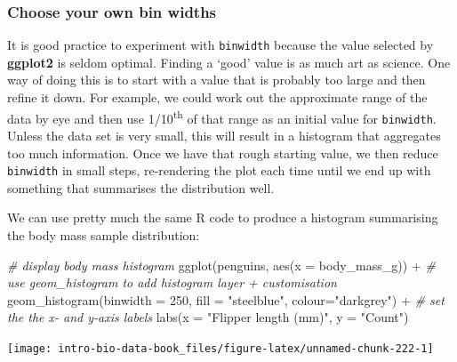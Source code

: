 \documentclass[
]{book}
\newenvironment{Shaded}{\begin{snugshade}}{\end{snugshade}}
\newcommand{\AttributeTok}[1]{\textcolor[rgb]{0.77,0.63,0.00}{#1}}
\newcommand{\CommentTok}[1]{\textcolor[rgb]{0.56,0.35,0.01}{\textit{#1}}}
\newcommand{\DecValTok}[1]{\textcolor[rgb]{0.00,0.00,0.81}{#1}}
\newcommand{\FunctionTok}[1]{\textcolor[rgb]{0.00,0.00,0.00}{#1}}
\newcommand{\NormalTok}[1]{#1}
\newcommand{\SpecialCharTok}[1]{\textcolor[rgb]{0.00,0.00,0.00}{#1}}
\newcommand{\StringTok}[1]{\textcolor[rgb]{0.31,0.60,0.02}{#1}}
\newenvironment{greybox}{
  \definecolor{shadecolor}{rgb}{0.95,0.95,0.95}  %
  \color{black}
  \begin{shaded}}
 {\end{shaded}}
\newenvironment{infobox}[1]
  {
  \begin{itemize}
  \renewcommand{\labelitemi}{
    \raisebox{-.7\height}[0pt][0pt]{
      {\setkeys{Gin}{width=3em,keepaspectratio}
        \texttt{[image: images/\#1]}}
    }
  }
  \setlength{\fboxsep}{1em}
  \begin{greybox}
  \item
  }
  {
  \end{greybox}
  \end{itemize}
  }
\begin{document}
\begin{infobox}{warning}

\hypertarget{choose-your-own-bin-widths}{%
\subsubsection*{Choose your own bin widths}\label{choose-your-own-bin-widths}}

It is good practice to experiment with \texttt{binwidth} because the value selected by \textbf{ggplot2} is seldom optimal. Finding a `good' value is as much art as science. One way of doing this is to start with a value that is probably too large and then refine it down. For example, we could work out the approximate range of the data by eye and then use 1/10\textsuperscript{th} of that range as an initial value for \texttt{binwidth}. Unless the data set is very small, this will result in a histogram that aggregates too much information. Once we have that rough starting value, we then reduce \texttt{binwidth} in small steps, re-rendering the plot each time until we end up with something that summarises the distribution well.

\end{infobox}

We can use pretty much the same R code to produce a histogram summarising the body mass sample distribution:

\begin{Shaded}
\begin{Highlighting}[]
\CommentTok{\# display body mass histogram}
\FunctionTok{ggplot}\NormalTok{(penguins, }\FunctionTok{aes}\NormalTok{(}\AttributeTok{x =}\NormalTok{ body\_mass\_g)) }\SpecialCharTok{+} 
  \CommentTok{\# use geom\_histogram to add histogram layer + customisation}
  \FunctionTok{geom\_histogram}\NormalTok{(}\AttributeTok{binwidth =} \DecValTok{250}\NormalTok{, }\AttributeTok{fill =} \StringTok{"steelblue"}\NormalTok{, }\AttributeTok{colour=}\StringTok{"darkgrey"}\NormalTok{) }\SpecialCharTok{+}
  \CommentTok{\# set the the x{-} and y{-}axis labels}
  \FunctionTok{labs}\NormalTok{(}\AttributeTok{x =} \StringTok{"Flipper length (mm)"}\NormalTok{, }\AttributeTok{y =} \StringTok{"Count"}\NormalTok{)}
\end{Highlighting}
\end{Shaded}

\begin{center}\texttt{[image: intro-bio-data-book\_files/figure-latex/unnamed-chunk-222-1]} \end{center}
\end{document}
